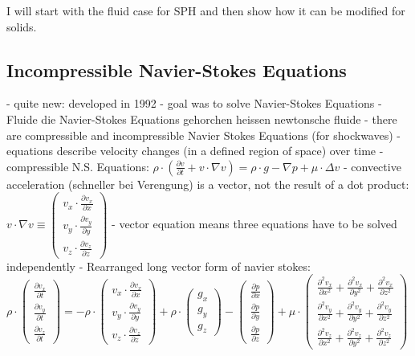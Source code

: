 I will start with the fluid case for SPH and then show how it can be modified for solids.

\subsection{Incompressible Navier-Stokes Equations}
- quite new: developed in 1992
- goal was to solve Navier-Stokes Equations
- Fluide die Navier-Stokes Equations gehorchen heissen newtonsche fluide
- there are compressible and incompressible Navier Stokes Equations (for shockwaves)
- equations describe velocity changes (in a defined region of space) over time
- compressible N.S. Equations:
$\rho \cdot (\frac{\partial v}{\partial t} + v \cdot \nabla v) = \rho \cdot g - \nabla p + \mu \cdot \Delta v$
- convective acceleration (schneller bei Verengung) is a vector, not the result of a dot product:
$v\cdot \nabla v \equiv \begin{pmatrix} v_x \cdot \frac{\partial v_x}{\partial x} \\ v_y \cdot \frac{\partial v_y}{\partial y} \\ v_z \cdot \frac{\partial v_z}{\partial z}\end{pmatrix}$
- vector equation means three equations have to be solved independently
- Rearranged long vector form of navier stokes:
$ \rho \cdot \begin{pmatrix} \frac{\partial v_x}{\partial t} \\ \frac{\partial v_y}{\partial t} \\ \frac{\partial v_z}{\partial t}\end{pmatrix} =  - \rho \cdot \begin{pmatrix} v_x \cdot \frac{\partial v_x}{\partial x} \\ v_y \cdot \frac{\partial v_y}{\partial y} \\ v_z \cdot \frac{\partial v_z}{\partial z}\end{pmatrix} + \rho \cdot \begin{pmatrix} g_x \\ g_y \\ g_z \end{pmatrix} - \begin{pmatrix} \frac{\partial p}{\partial x} \\ \frac{\partial p}{\partial y} \\ \frac{\partial p}{\partial z}\end{pmatrix} + \mu \cdot \begin{pmatrix}  \frac{\partial^{2} v_x}{\partial x^{2}} + \frac{\partial^{2} v_x}{\partial y^{2}} + \frac{\partial^{2} v_x}{\partial z^{2}} \\ \frac{\partial^{2} v_y}{\partial x^{2}} + \frac{\partial^{2} v_y}{\partial y^{2}} + \frac{\partial^{2} v_y}{\partial z^{2}} \\ \frac{\partial^{2} v_z}{\partial x^{2}} + \frac{\partial^{2} v_z}{\partial y^{2}} + \frac{\partial^{2} v_z}{\partial z^{2}} \end{pmatrix} $
